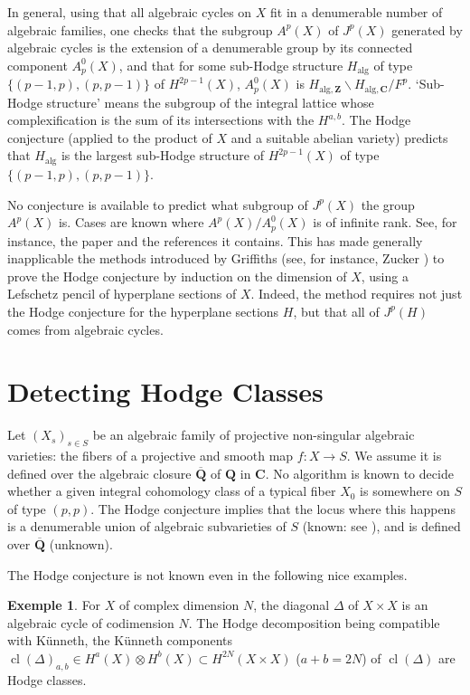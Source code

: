 \documentclass[11pt,a4paper]{article}
\theoremstyle{plain}
\theoremstyle{definition}
\newtheorem{example}[theorem]{Exemple}
\DeclareMathOperator{\cl}{cl}
\begin{document}
In general, using that all algebraic cycles on $X$ fit in a denumerable number of algebraic families, one checks that the subgroup $A^{p}(X)$ of $J^{p}(X)$ generated by algebraic cycles is the extension of a denumerable group by its connected component $A^{0}_{p}(X)$, and that for some sub-Hodge structure $H_{\text{alg}}$ of type $\{(p-1,p), (p,p-1)\}$ of $H^{2p-1}(X)$, $A^{0}_{p}(X)$ is $H_{\text{alg},\mathbf{Z}} \backslash H_{\text{alg},\mathbf{C}} / F^{p}$. `Sub-Hodge structure' means the subgroup of the integral lattice whose complexification is the sum of its intersections with the $H^{a,b}$. The Hodge conjecture (applied to the product of $X$ and a suitable abelian variety) predicts that $H_{\text{alg}}$ is the largest sub-Hodge structure of $H^{2p-1}(X)$ of type $\{(p-1,p),(p,p-1)\}$.

No conjecture is available to predict what subgroup of $J^{p}(X)$ the group $A^{p}(X)$ is. Cases are known where $A^{p}(X)/A^{0}_{p}(X)$ is of infinite rank. See, for instance, the paper \cite{voisin2000} and the references it contains. This has made generally inapplicable the methods introduced by Griffiths (see, for instance, Zucker \cite{zucker1977}) to prove the Hodge conjecture by induction on the dimension of $X$, using a Lefschetz pencil of hyperplane sections of $X$. Indeed, the method requires not just the Hodge conjecture for the hyperplane sections $H$, but that all of $J^{p}(H)$ comes from algebraic cycles.

\section{Detecting Hodge Classes}

Let $(X_{s})_{s \in S}$ be an algebraic family of projective non-singular algebraic varieties: the fibers of a projective and smooth map $f : X \to S$. We assume it is defined over the algebraic closure $\overline{\mathbf{Q}}$ of $\mathbf{Q}$ in $\mathbf{C}$. No algorithm is known to decide whether a given integral cohomology class of a typical fiber $X_{0}$ is somewhere on $S$ of type $(p,p)$. The Hodge conjecture implies that the locus where this happens is a denumerable union of algebraic subvarieties of $S$ (known: see \cite{cattani-deligne-kaplan1995}), and is defined over $\overline{\mathbf{Q}}$ (unknown).

The Hodge conjecture is not known even in the following nice examples.

\begin{example}
For $X$ of complex dimension $N$, the diagonal $\Delta$ of $X \times X$ is an algebraic cycle of codimension $N$. The Hodge decomposition being compatible with K\"unneth, the K\"unneth components $\cl(\Delta)_{a,b} \in H^{a}(X) \otimes H^{b}(X) \subset H^{2N}(X \times X)$ ($a+b=2N$) of $\cl(\Delta)$ are Hodge classes.
\end{example}
\end{document}

